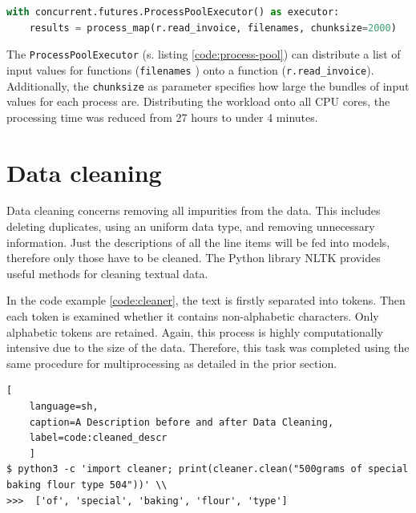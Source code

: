 \begin{lstlisting}[language=python, 
label=code:process-pool,
caption=Spawning a Process Pool in Python,
style=EigenerPythonStyle]   
with concurrent.futures.ProcessPoolExecutor() as executor:
	results = process_map(r.read_invoice, filenames, chunksize=2000)
\end{lstlisting}

	The \lstinline|ProcessPoolExecutor| (s. listing \ref{code:process-pool}) can distribute a list of input values for functions (\lstinline|filenames| ) onto a function (\lstinline|r.read_invoice|). Additionally, the \lstinline|chunksize| as parameter specifies how large the bundles of input values for each process are. Distributing the workload onto all \acs{CPU} cores, the processing time was reduced from 27 hours to under 4 minutes. 
	
	\section{Data cleaning}
	Data cleaning concerns removing all impurities from the data. This includes deleting duplicates, using an uniform data type, and removing unnecessary information.
	Just the descriptions of all the line items will be fed into models, therefore only those have to be cleaned. The Python library \ac{NLTK} provides useful methods for cleaning textual data.
	
	
	
	In the code example \ref{code:cleaner}, the text is firstly separated into tokens. Then each token is examined whether it contains non-alphabetic characters. Only alphabetic tokens are retained. Again, this process is highly computationally intensive due to the size of the data. Therefore, this task was completed using the same procedure for multiprocessing as detailed in the prior section.
	
\begin{lstlisting}[
	language=sh,
	caption=A Description before and after Data Cleaning,
	label=code:cleaned_descr
	]
$ python3 -c 'import cleaner; print(cleaner.clean("500grams of special baking flour type 504"))' \\
>>>  ['of', 'special', 'baking', 'flour', 'type']
\end{lstlisting}
	 
